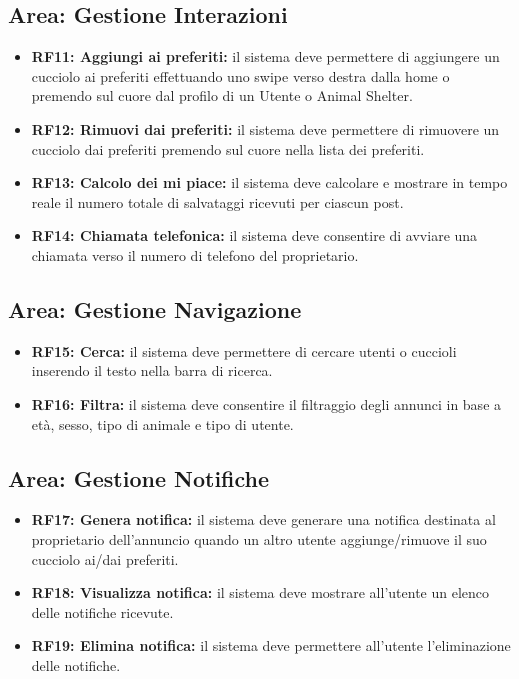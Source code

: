 \documentclass[a4paper]{report}
\begin{document}
\subsection*{Area: Gestione Interazioni}
\begin{itemize}
    \item \textbf{RF11: Aggiungi ai preferiti:} il sistema deve permettere di aggiungere un cucciolo ai preferiti effettuando uno swipe verso destra dalla home o premendo sul cuore dal profilo di un Utente o Animal Shelter.
    \item \textbf{RF12: Rimuovi dai preferiti:} il sistema deve permettere di rimuovere un cucciolo dai preferiti premendo sul cuore nella lista dei preferiti.
    \item \textbf{RF13: Calcolo dei mi piace:} il sistema deve calcolare e mostrare in tempo reale il numero totale di salvataggi ricevuti per ciascun post.
    \item \textbf{RF14: Chiamata telefonica:} il sistema deve consentire di avviare una chiamata verso il numero di telefono del proprietario.
\end{itemize}
\subsection*{Area: Gestione Navigazione}
\begin{itemize}
    \item \textbf{RF15: Cerca:} il sistema deve permettere di cercare utenti o cuccioli inserendo il testo nella barra di ricerca.
    \item \textbf{RF16: Filtra:} il sistema deve consentire il filtraggio degli annunci in base a età, sesso, tipo di animale e tipo di utente.
\end{itemize}
\subsection*{Area: Gestione Notifiche}
\begin{itemize}
    \item \textbf{RF17: Genera notifica:} il sistema deve generare una notifica destinata al proprietario dell'annuncio quando un altro utente aggiunge/rimuove il suo cucciolo ai/dai preferiti.
    \item \textbf{RF18: Visualizza notifica:} il sistema deve mostrare all'utente un elenco delle notifiche ricevute.
    \item  \textbf{RF19: Elimina notifica:} il sistema deve permettere all'utente l'eliminazione delle notifiche.
\end{itemize}
\end{document}
